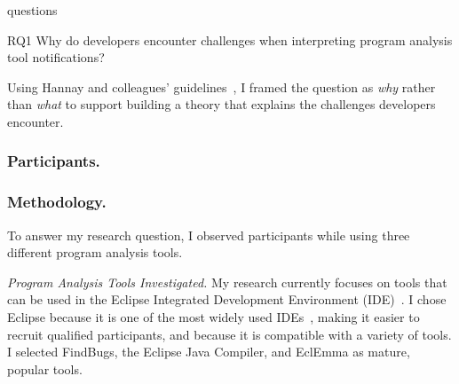 \documentclass{llncs}
\begin{document}
\begin{labeling}{questions}
	\item [RQ1] Why do developers encounter challenges when interpreting program analysis tool notifications? 
\end{labeling}

Using Hannay and colleagues' guidelines~\cite{hannay2007systematic}, I framed the question as \emph{why} rather than \emph{what} to support building a theory that explains the challenges developers encounter.

\subsubsection{Participants.}


\subsubsection{Methodology.} To answer my research question, I observed participants while using three different program analysis tools.

\vspace{0.5em}
\noindent\textit{Program Analysis Tools Investigated.}
My research currently focuses on tools that can be used in the Eclipse Integrated Development Environment (IDE)~\cite{EclipseIDE}. I chose Eclipse because it is one of the most widely used IDEs~\cite{Goth:2005:Beware}, making it easier to recruit qualified participants, and because it is compatible with a variety of tools. I selected FindBugs, the Eclipse Java Compiler, and
EclEmma as mature, popular tools.
\end{document}
